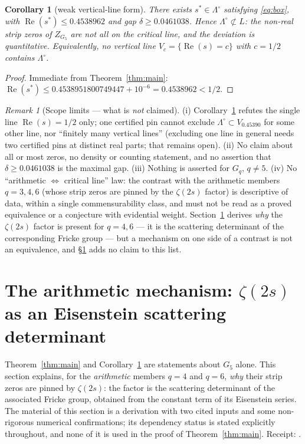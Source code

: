 \documentclass[11pt]{article}
\newtheorem{corollary}[theorem]{Corollary}
\theoremstyle{definition}
\theoremstyle{remark}
\newtheorem{remark}[theorem]{Remark}
\renewcommand{\Re}{\operatorname{Re}}
\begin{document}
\begin{corollary}[weak vertical-line form]
\label{cor:line}
There exists $s^* \in \Lambda^\circ$ satisfying \eqref{eq:box}, with
$\Re(s^*) \le 0.4538962$ and gap $\delta \ge 0.0461038$. Hence
$\Lambda^\circ \not\subset L$: the non-real strip zeros of $Z_{G_5}$
are not all on the critical line, and the deviation is quantitative.
Equivalently, no vertical line $V_c = \{\Re(s) = c\}$ with $c = 1/2$
contains $\Lambda^\circ$.
\end{corollary}

\begin{proof}
Immediate from Theorem~\ref{thm:main}:
$\Re(s^*) \le 0.4538951800749447 + 10^{-6} = 0.4538962 < 1/2$.
\end{proof}

\begin{remark}[Scope limits --- what is \emph{not} claimed]
\label{rem:scope}
(i) Corollary~\ref{cor:line} refutes the single line $\Re(s) = 1/2$
only; one certified pin cannot exclude $\Lambda^\circ \subset
V_{0.45390}$ for some other line, nor ``finitely many vertical lines''
(excluding one line in general needs two certified pins at distinct
real parts; that remains open). (ii) No claim about all or most zeros,
no density or counting statement, and no assertion that
$\delta \ge 0.0461038$ is the maximal gap. (iii) Nothing is asserted
for $G_q$, $q \neq 5$. (iv) No ``arithmetic $\Leftrightarrow$ critical
line'' law: the contrast with the arithmetic members $q = 3, 4, 6$
(whose strip zeros are pinned by the $\zeta(2s)$ factor) is descriptive
of data, within a single commensurability class, and must not be read
as a proved equivalence or a conjecture with evidential weight.
Section~\ref{sec:mechanism} derives \emph{why} the $\zeta(2s)$ factor is
present for $q = 4, 6$ --- it is the scattering determinant of the
corresponding Fricke group --- but a mechanism on one side of a contrast
is not an equivalence, and \S\ref{sec:mechanism} adds no claim to
this list.
\end{remark}

\section{The arithmetic mechanism: $\zeta(2s)$ as an Eisenstein
scattering determinant}
\label{sec:mechanism}

Theorem~\ref{thm:main} and Corollary~\ref{cor:line} are statements about
$G_5$ alone. This section explains, for the \emph{arithmetic} members
$q = 4$ and $q = 6$, \emph{why} their strip zeros are pinned by
$\zeta(2s)$: the factor is the scattering determinant of the associated
Fricke group, obtained from the constant term of its Eisenstein series.
The material of this section is a derivation with two cited inputs and
some non-rigorous numerical confirmations; its dependency status is
stated explicitly throughout, and none of it is used in the proof of
Theorem~\ref{thm:main}. Receipt: \cite{M1F,M1D,M1E}.
\end{document}
